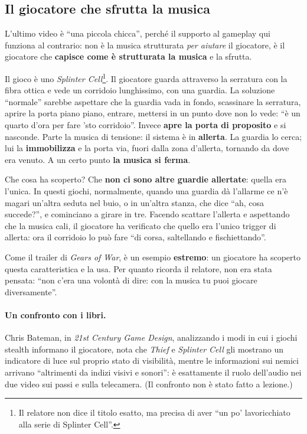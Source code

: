 \subsection{Il giocatore che sfrutta la musica}

L'ultimo video è ``una piccola chicca'', perché il supporto al gameplay qui
funziona al contrario: non è la musica strutturata \emph{per aiutare} il
giocatore, è il giocatore che \textbf{capisce come è strutturata la musica} e la
sfrutta.

Il gioco è uno \emph{Splinter Cell}\footnote{Il relatore non dice il titolo
esatto, ma precisa di aver ``un po' lavoricchiato alla serie di Splinter Cell''.}.
Il giocatore guarda attraverso la serratura con la fibra ottica e vede un
corridoio lunghissimo, con una guardia. La soluzione ``normale'' sarebbe
aspettare che la guardia vada in fondo, scassinare la serratura, aprire la porta
piano piano, entrare, mettersi in un punto dove non lo vede: ``è un quarto d'ora
per fare 'sto corridoio''. Invece \textbf{apre la porta di proposito} e si
nasconde. Parte la musica di tensione: il sistema è in \textbf{allerta}. La
guardia lo cerca; lui la \textbf{immobilizza} e la porta via, fuori dalla zona
d'allerta, tornando da dove era venuto. A un certo punto \textbf{la musica si
ferma}.

Che cosa ha scoperto? Che \textbf{non ci sono altre guardie allertate}: quella
era l'unica. In questi giochi, normalmente, quando una guardia dà l'allarme ce
n'è magari un'altra seduta nel buio, o in un'altra stanza, che dice ``ah, cosa
succede?'', e cominciano a girare in tre. Facendo scattare l'allerta e
aspettando che la musica cali, il giocatore ha verificato che quello era l'unico
trigger di allerta: ora il corridoio lo può fare ``di corsa, saltellando e
fischiettando''.

Come il trailer di \emph{Gears of War}, è un esempio \textbf{estremo}: un
giocatore ha scoperto questa caratteristica e la usa. Per quanto ricorda il
relatore, non era stata pensata: ``non c'era una volontà di dire: con la musica
tu puoi giocare diversamente''.

\paragraph{Un confronto con i libri.} Chris Bateman, in \emph{21st Century Game
Design}, analizzando i modi in cui i giochi stealth informano il giocatore, nota
che \emph{Thief} e \emph{Splinter Cell} gli mostrano un indicatore di luce sul
proprio stato di visibilità, mentre le informazioni sui nemici arrivano
``altrimenti da indizi visivi e sonori'': è esattamente il ruolo dell'audio nei
due video sui passi e sulla telecamera. (Il confronto non è stato fatto a
lezione.)

